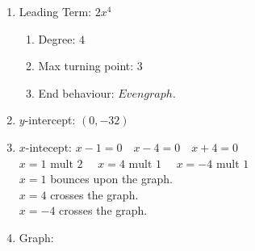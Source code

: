 \begin{example}
\begin{enumerate}
\begin{enumerate}
    \item Leading Term: $2x^4$
      \begin{enumerate}
      \item Degree: $4$
      \item Max turning point: $3$
      \item End behaviour: $Even graph.$
      \end{enumerate}
    \item $y$-intercept: $(0,  -32)$
    \item $x$-intecept: $x - 1 = 0 \quad x - 4 = 0 \quad x + 4 = 0$ \\
      $x = 1 \text{ mult 2 }\quad x = 4 \text{ mult 1 } \quad x = -4 \text{ mult 1 }$ \\
      $x = 1$ bounces upon the graph. \\
      $x = 4$ crosses the graph. \\
      $x = -4$ crosses the graph.
    \item Graph:
      \begin{center}
      \end{center}
    \end{enumerate}
  \end{enumerate}
\end{example}

